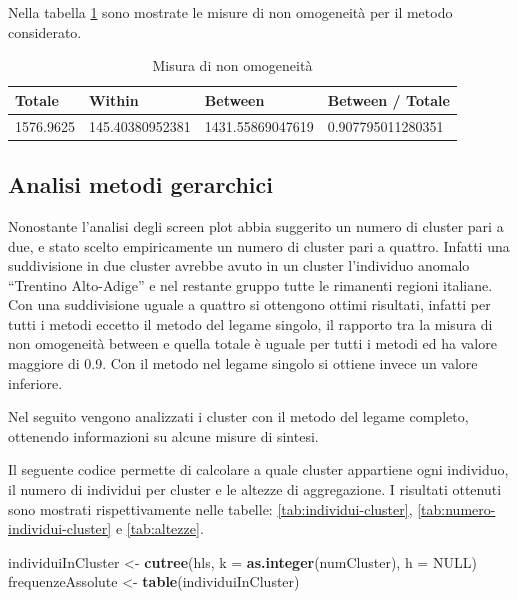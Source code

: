 \documentclass[]{book}
\newenvironment{Shaded}{\begin{snugshade}}{\end{snugshade}}
\newcommand{\KeywordTok}[1]{\textcolor[rgb]{0.13,0.29,0.53}{\textbf{#1}}}
\newcommand{\DataTypeTok}[1]{\textcolor[rgb]{0.13,0.29,0.53}{#1}}
\newcommand{\StringTok}[1]{\textcolor[rgb]{0.31,0.60,0.02}{#1}}
\newcommand{\OtherTok}[1]{\textcolor[rgb]{0.56,0.35,0.01}{#1}}
\newcommand{\NormalTok}[1]{#1}
\begin{document}
Nella tabella \ref{tab:legame-mediana-misure-omogeneita} sono mostrate
le misure di non omogeneità per il metodo considerato.

\begin{table}

\caption{\label{tab:legame-mediana-misure-omogeneita}Misura di non omogeneità}
\centering
\begin{tabular}[t]{l|l|l|l}
\hline
Totale & Within & Between & Between / Totale\\
\hline
1576.9625 & 145.40380952381 & 1431.55869047619 & 0.907795011280351\\
\hline
\end{tabular}
\end{table}

\subsection{Analisi metodi gerarchici}\label{analisi-metodi-gerarchici}

Nonostante l'analisi degli screen plot abbia suggerito un numero di
cluster pari a due, e stato scelto empiricamente un numero di cluster
pari a quattro. Infatti una suddivisione in due cluster avrebbe avuto in
un cluster l'individuo anomalo ``Trentino Alto-Adige'' e nel restante
gruppo tutte le rimanenti regioni italiane. Con una suddivisione uguale
a quattro si ottengono ottimi risultati, infatti per tutti i metodi
eccetto il metodo del legame singolo, il rapporto tra la misura di non
omogeneità between e quella totale è uguale per tutti i metodi ed ha
valore maggiore di 0.9. Con il metodo nel legame singolo si ottiene
invece un valore inferiore.

Nel seguito vengono analizzati i cluster con il metodo del legame
completo, ottenendo informazioni su alcune misure di sintesi.

Il seguente codice permette di calcolare a quale cluster appartiene ogni
individuo, il numero di individui per cluster e le altezze di
aggregazione. I risultati ottenuti sono mostrati rispettivamente nelle
tabelle: \ref{tab:individui-cluster}, \ref{tab:numero-individui-cluster}
e \ref{tab:altezze}.

\begin{Shaded}
\begin{Highlighting}[]
\NormalTok{individuiInCluster <-}\StringTok{ }\KeywordTok{cutree}\NormalTok{(hls, }\DataTypeTok{k =} \KeywordTok{as.integer}\NormalTok{(numCluster), }\DataTypeTok{h =} \OtherTok{NULL}\NormalTok{)}
\NormalTok{frequenzeAssolute <-}\StringTok{ }\KeywordTok{table}\NormalTok{(individuiInCluster)}
\end{Highlighting}
\end{Shaded}
\end{document}
